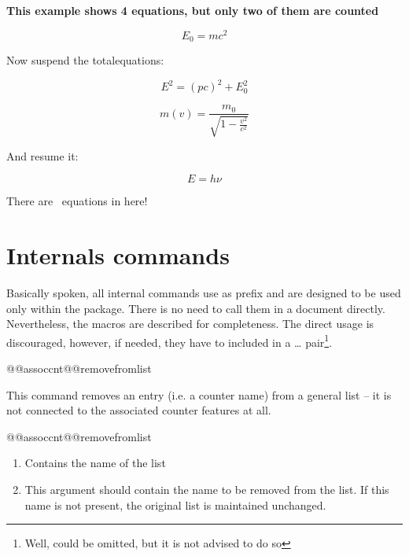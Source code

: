 \documentclass[12pt,paper=a4]{article}
\begin{document}
\begin{dispExample}
\textbf{This example shows 4 equations, but only two of them are counted}

\begin{equation}
E_{0} = mc^2
\end{equation}

Now suspend the totalequations:

\begin{equation}
E^2 = \left({ pc}\right)^2 + E^{2}_{0}
\end{equation}

\begin{equation}
  m(v) = \frac{m_{0}}{\sqrt{1-\frac{v^2}{c^2}}} 
\end{equation}

And resume it: \ResumeSuspendedCounters

\begin{equation}
  E = h \nu
\end{equation}

There are \number{}~equations in here!
\end{dispExample}




\section{Internals commands}

Basically spoken, all internal commands use  as prefix and are designed to be used only within the package. There is no need to call them in a document directly. Nevertheless, the macros are described for completeness. The direct usage is discouraged, however, if needed, they have to included in a  \ldots {} pair\footnote{Well,  could be omitted, but it is not advised to do so}.

\begin{docCommand}{@@assoccnt@@removefromlist}{}

This command removes an entry (i.e. a counter name) from a general list -- it is not connected to the associated counter features at all. 
\begin{docCommandArgs}{@@assoccnt@@removefromlist}%
\begin{enumerate}[label={\textcolor{blue}{\#\arabic*}}]
\item {}%

  Contains the name of the list

\item {}

  This argument should contain the name to be removed from the list. If this name is not present, the original list is maintained unchanged. 

\end{enumerate}
\end{docCommandArgs}

\end{docCommand}%
\end{document}
